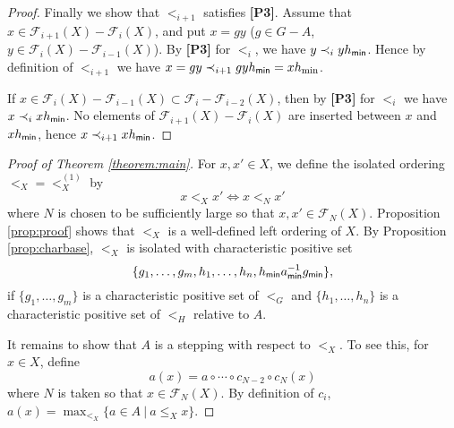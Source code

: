 \documentclass[10pt]{amsart}
\numberwithin{equation}{section}
\begin{document}
\begin{proof}
Finally we show that $<_{i+1}$ satisfies {\bf [P3]}. Assume that $x \in {\mathcal{F}}_{i+1}(X)-{\mathcal{F}}_{i}(X)$, and put $x=gy$ ($g \in G-A$, $y\in {\mathcal{F}}_{i}(X)-{\mathcal{F}}_{i-1}(X)$). By {\bf [P3]} for $<_{i}$, we have $y \prec_{i} yh_{\sf min}$. Hence by definition of $<_{i+1}$ we have $x = gy \prec_{i+1} gyh_{\sf min} = xh_{\sf \min}$. 

If $x \in {\mathcal{F}}_{i}(X)-{\mathcal{F}}_{i-1}(X) \subset {\mathcal{F}}_{i}-{\mathcal{F}}_{i-2}(X)$, then by {\bf [P3]} for $<_{i}$ we have $x \prec_{i} xh_{\sf min}$.
No elements of ${\mathcal{F}}_{i+1}(X)-{\mathcal{F}}_{i}(X)$ are inserted between $x$ and $xh_{\sf min}$, hence $x \prec_{i+1} xh_{\sf min}$. 

\end{proof}

\begin{proof}[Proof of Theorem \ref{theorem:main}]
For $x,x' \in X$, we define the isolated ordering $<_{X}=<_{X}^{(1)}$ by
\[ x <_{X} x' \iff x <_{N} x' \]
where $N$ is chosen to be sufficiently large so that $x,x' \in {\mathcal{F}}_{N}(X)$.
Proposition \ref{prop:proof} shows that $<_{X}$ is a well-defined left ordering of $X$. By Proposition \ref{prop:charbase}, $<_{X}$ is isolated with characteristic positive set 
\[\{g_1,\ldots,g_m, h_1,\ldots,h_n, h_{\sf min}a_{\sf min}^{-1}g_{\sf min}\}, \]
if $\{g_1,\ldots,g_m\}$ is a characteristic positive set of $<_{G}$ and $\{ h_1,\ldots,h_n\}$ is a characteristic positive set of $<_{H}$ relative to $A$.

It remains to show that $A$ is a stepping with respect to $<_{X}$.
To see this, for $x \in X$, define
\[a(x) = a \circ \cdots \circ c_{N-2}\circ c_{N}(x) \]
where $N$ is taken so that $x \in {\mathcal{F}}_{N}(X)$.
By definition of $c_{i}$, $a(x) = \max_{<_{X}}\{a \in A \: | \: a\leq_{X} x\}$.
\end{proof}
\end{document}
